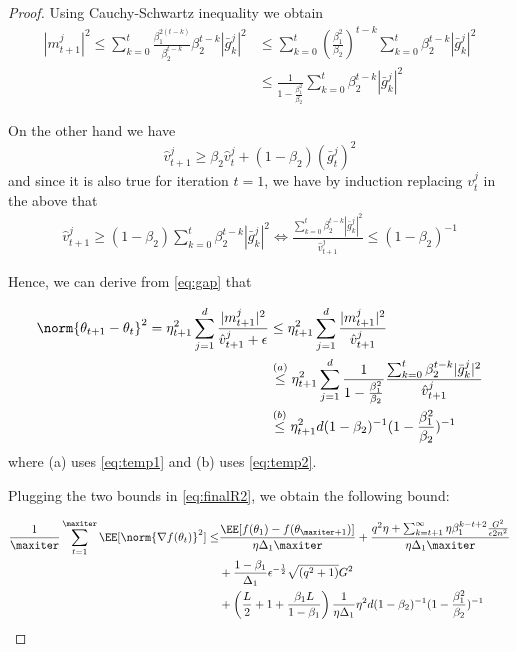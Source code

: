 \documentclass[11pt]{article}
\begin{document}
\begin{proof}
Using Cauchy-Schwartz inequality we obtain
\begin{equation}\label{eq:temp1}
\begin{split}
|m_{t+1}^j|^2  \leq \sum_{k=0}^t \frac{\beta_1^{2(t-k)}}{\beta_2^{t-k}}\beta_2^{t-k}|\bar g_k^j|^2 &\leq \sum_{k=0}^t \left(\frac{\beta_1^{2}}{\beta_2}\right)^{t-k}  \sum_{k=0}^t\beta_2^{t-k}|\bar g_k^j|^2\\
&\leq \frac{1}{1 - \frac{\beta_1^{2}}{\beta_2}} \sum_{k=0}^t\beta_2^{t-k}|\bar g_k^j|^2
\end{split}
\end{equation}

On the other hand we have
\begin{equation}
\hat{v}^j_{t+1} \geq \beta_2 \hat{v}^j_{t} + (1-\beta_2) (\bar g_t^j)^2
\end{equation}
and since it is also true for iteration $t=1$, we have by induction replacing $v_t^j$ in the above that 
\begin{equation}\label{eq:temp2}
\begin{split}
\hat{v}^j_{t+1} \geq (1-\beta_2) \sum_{k=0}^t\beta_2^{t-k}|\bar g_k^j|^2 \iff  \frac{\sum_{k=0}^t\beta_2^{t-k}|\bar g_k^j|^2}{ \hat{v}^j_{t+1}} \leq    (1-\beta_2)^{-1}
\end{split}
\end{equation}

Hence, we can derive from \eqref{eq:gap} that

\begin{equation}\label{eq:gap2}
\begin{split}
\norm{\theta_{t+1} - \theta_{t}}^2  = \eta_{t+1}^2 \sum_{j=1}^d  \frac{|m_{t+1}^j|^2}{\hat{v}^j_{t+1} + \epsilon}&\leq  \eta_{t+1}^2 \sum_{j=1}^d  \frac{|m_{t+1}^j|^2}{\hat{v}^j_{t+1}}\\
&\overset{(a)}{\leq}   \eta_{t+1}^2 \sum_{j=1}^d  \frac{1}{1 - \frac{\beta_1^{2}}{\beta_2}} \frac{\sum_{k=0}^t\beta_2^{t-k}|\bar g_k^j|^2}{\hat{v}^j_{t+1}}\\
&\overset{(b)}{\leq} \eta_{t+1}^2 d (1-\beta_2)^{-1} (1 - \frac{\beta_1^{2}}{\beta_2})^{-1}
\end{split}
\end{equation}
where (a) uses \eqref{eq:temp1} and (b) uses \eqref{eq:temp2}.


Plugging the two bounds in \eqref{eq:finalR2}, we obtain the following bound:

\begin{equation}
\begin{split}
 \frac{1}{\maxiter}\sum_{t=1}^{\maxiter } \EE[\norm{\nabla f(\theta_t)}^2] \leq & \frac{\EE[ f(\theta_{1}) - f(\theta_{\maxiter+1})]}{\eta \Delta_1 \maxiter} + \frac{q^2 \eta+ \sum_{k=t+1}^\infty \eta \beta_1^{k-t+2}\frac{G^2 }{\epsilon 2n^2}}{\eta \Delta_1\maxiter}\\
&+\frac{1-\beta_1}{\Delta_1}  \epsilon^{-\frac{1}{2}} \sqrt{(q^2+1)}G^2 \\
& + \left(\frac{L}{2} + 1+ \frac{\beta_1L}{1-\beta_1} \right)\frac{1}{\eta \Delta_1}  \eta^2 d (1-\beta_2)^{-1} (1 - \frac{\beta_1^{2}}{\beta_2})^{-1}
\end{split}
\end{equation}



\end{proof}
\end{document}
